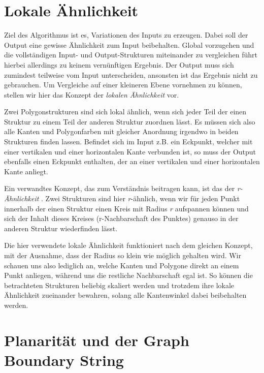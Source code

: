 \section{Lokale Ähnlichkeit}
Ziel des Algorithmus ist es, Variationen des Inputs zu erzeugen. Dabei soll der Output eine gewisse Ähnlichkeit zum Input beibehalten. Global
vorzugehen und die vollständigen Input- und Output-Strukturen miteinander zu vergleichen führt hierbei allerdings zu keinem vernünftigen
Ergebnis. Der Output muss sich zumindest teilweise vom Input unterscheiden, ansonsten ist das Ergebnis nicht zu gebrauchen. Um Vergleiche
auf einer kleineren Ebene vornehmen zu können, stellen wir hier das Konzept der \textit{lokalen Ähnlichkeit} vor.

Zwei Polygonstrukturen sind sich lokal ähnlich, wenn sich jeder Teil der einen Struktur zu einem Teil der anderen Struktur zuordnen lässt. Es
müssen sich also alle Kanten und Polygonfarben mit gleicher Anordnung irgendwo in beiden Strukturen finden lassen. Befindet sich im Input z.B.
ein Eckpunkt, welcher mit einer vertikalen und einer horizontalen Kante verbunden ist, so muss der Output ebenfalls einen Eckpunkt enthalten,
der an einer vertikalen und einer horizontalen Kante anliegt.


Ein verwandtes Konzept, das zum Verständnis beitragen kann, ist das der \textit{r-Ähnlichkeit} \cite{3_bokeloh_et_al}. Zwei Strukturen sind hier
\textit{r}-ähnlich, wenn wir für jeden Punkt innerhalb der einen Struktur einen Kreis mit Radius \textit{r} aufspannen können und sich der Inhalt
dieses Kreises (r-Nachbarschaft des Punktes) genauso in der anderen Struktur wiederfinden lässt.


Die hier verwendete lokale Ähnlichkeit funktioniert nach dem gleichen Konzept, mit der Ausnahme, dass der Radius so klein wie möglich gehalten
wird. Wir schauen uns also lediglich an, welche Kanten und Polygone direkt an einem Punkt anliegen, während uns die restliche Nachbarschaft
egal ist. So können die betrachteten Strukturen beliebig skaliert werden und trotzdem ihre lokale Ähnlichkeit zueinander bewahren, solang alle
Kantenwinkel dabei beibehalten werden.

\section{Planarität und der Graph Boundary String}

